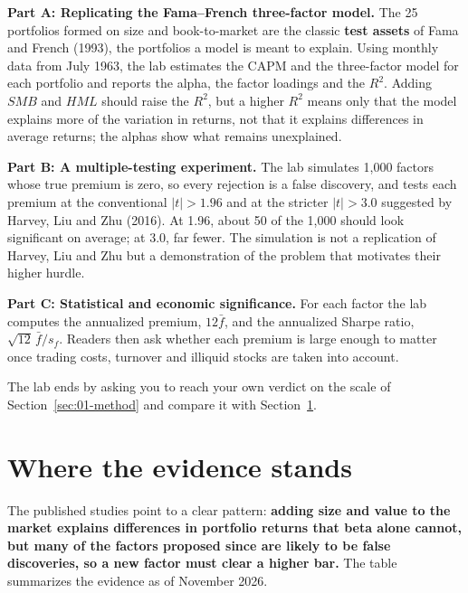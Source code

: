 \textbf{Part A: Replicating the Fama--French three-factor model.} The 25 portfolios formed on size and book-to-market are the classic \textbf{test assets} of Fama and French (1993), the portfolios a model is meant to explain. Using monthly data from July 1963, the lab estimates the CAPM and the three-factor model for each portfolio and reports the alpha, the factor loadings and the $R^2$. Adding $SMB$ and $HML$ should raise the $R^2$, but a higher $R^2$ means only that the model explains more of the variation in returns, not that it explains differences in average returns; the alphas show what remains unexplained.

\textbf{Part B: A multiple-testing experiment.} The lab simulates 1,000 factors whose true premium is zero, so every rejection is a false discovery, and tests each premium at the conventional $|t|>1.96$ and at the stricter $|t|>3.0$ suggested by Harvey, Liu and Zhu (2016). At 1.96, about 50 of the 1,000 should look significant on average; at 3.0, far fewer. The simulation is not a replication of Harvey, Liu and Zhu but a demonstration of the problem that motivates their higher hurdle.

\textbf{Part C: Statistical and economic significance.} For each factor the lab computes the annualized premium, $12\bar{f}$, and the annualized Sharpe ratio, $\sqrt{12}\,\bar{f}/s_f$. Readers then ask whether each premium is large enough to matter once trading costs, turnover and illiquid stocks are taken into account.

The lab ends by asking you to reach your own verdict on the scale of Section~\ref{sec:01-method} and compare it with Section~\ref{sec:04-verdict}.

\section{Where the evidence stands}
\label{sec:04-verdict}

The published studies point to a clear pattern: \textbf{adding size and value to the market explains differences in portfolio returns that beta alone cannot, but many of the factors proposed since are likely to be false discoveries, so a new factor must clear a higher bar.} The table summarizes the evidence as of November 2026.

